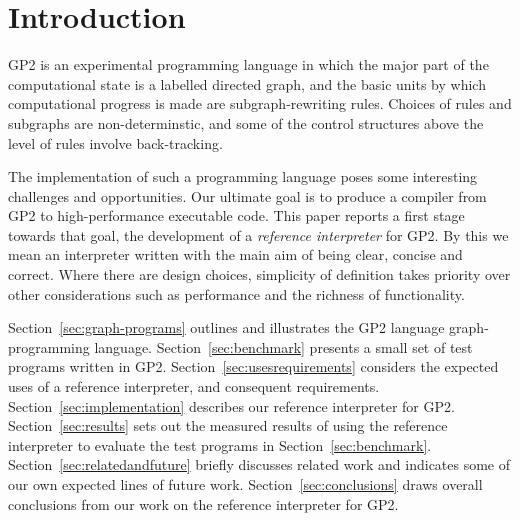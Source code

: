 \section{Introduction}

GP2 is an experimental programming language in which the major part of
the computational state is a labelled directed graph, and the basic
units by which computational progress is made are subgraph-rewriting
rules.
Choices of rules and subgraphs are non-determinstic, and some of
the control structures above the level of rules involve back-tracking.

The implementation of such a programming language poses some
interesting challenges and opportunities.
Our ultimate goal is to produce a compiler from GP2 to
high-performance executable code.
This paper reports a first stage towards that goal, the development
of a \emph{reference interpreter} for GP2.
By this we mean an interpreter written with the main aim of
being clear, concise and correct.
Where there are design choices, simplicity of
definition takes priority over other considerations
such as performance and the richness of functionality.

Section~\ref{sec:graph-programs} outlines and illustrates the GP2 language
graph-programming language.
Section~\ref{sec:benchmark} presents a small set of test programs
written in GP2.
Section~\ref{sec:usesrequirements} considers the expected uses of
a reference interpreter, and consequent requirements.
Section~\ref{sec:implementation} describes our reference interpreter for
GP2.
Section~\ref{sec:results} sets out the measured results of using the reference
interpreter to evaluate the test programs in Section~\ref{sec:benchmark}.
Section~\ref{sec:relatedandfuture} briefly discusses related work and
indicates some of our own expected lines of future work.
Section~\ref{sec:conclusions} draws overall conclusions from our work
on the reference interpreter for GP2.

